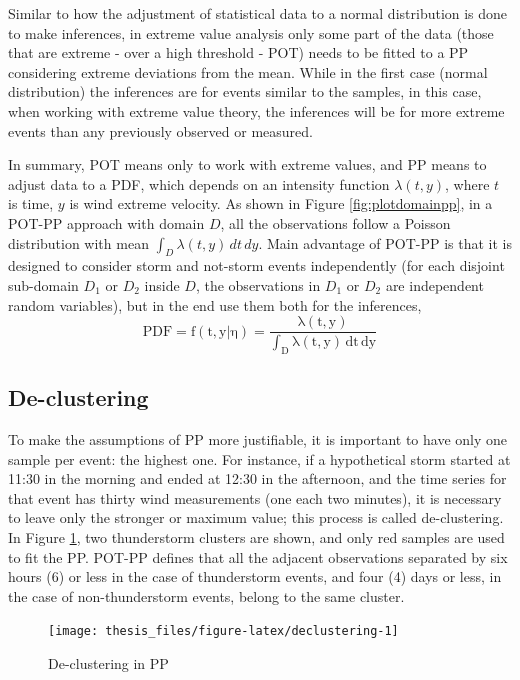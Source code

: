\documentclass[12pt,twoside]{reedthesis}
\begin{document}
Similar to how the adjustment of statistical data to a normal distribution is done to make inferences, in extreme value analysis only some part of the data (those that are extreme - over a high threshold - POT) needs to be fitted to a PP considering extreme deviations from the mean. While in the first case (normal distribution) the inferences are for events similar to the samples, in this case, when working with extreme value theory, the inferences will be for more extreme events than any previously observed or measured.

In summary, POT means only to work with extreme values, and PP means to adjust data to a PDF, which depends on an intensity function \(\lambda(t,y)\), where \(t\) is time, \(y\) is wind extreme velocity. As shown in Figure \ref{fig:plotdomainpp}, in a POT-PP approach with domain \(D\), all the observations follow a Poisson distribution with mean \(\int_D\lambda(t,y)\,dt\,dy\). Main advantage of POT-PP is that it is designed to consider storm and not-storm events independently (for each disjoint sub-domain \(D_1\) or \(D_2\) inside \(D\), the observations in \(D_1\) or \(D_2\) are independent random variables), but in the end use them both for the inferences,
\begin{equation}
  \mathrm{
          PDF = f(t,y|\eta) = \frac{\lambda(t,y)}{\int_D\lambda(t,y)\,dt\,dy}
        }
  \label{eq:pppdf}
\end{equation}
\hypertarget{decluster}{%
\subsection{De-clustering}\label{decluster}}

To make the assumptions of PP more justifiable, it is important to have only one sample per event: the highest one. For instance, if a hypothetical storm started at 11:30 in the morning and ended at 12:30 in the afternoon, and the time series for that event has thirty wind measurements (one each two minutes), it is necessary to leave only the stronger or maximum value; this process is called de-clustering. In Figure \ref{fig:declustering}, two thunderstorm clusters are shown, and only red samples are used to fit the PP. POT-PP defines that all the adjacent observations separated by six hours (6) or less in the case of thunderstorm events, and four (4) days or less, in the case of non-thunderstorm events, belong to the same cluster.

\footnotesize
\begin{figure}

{\centering \texttt{[image: thesis\_files/figure-latex/declustering-1]} 

}

\caption{De-clustering in PP}\label{fig:declustering}
\end{figure}
\normalsize
\end{document}
